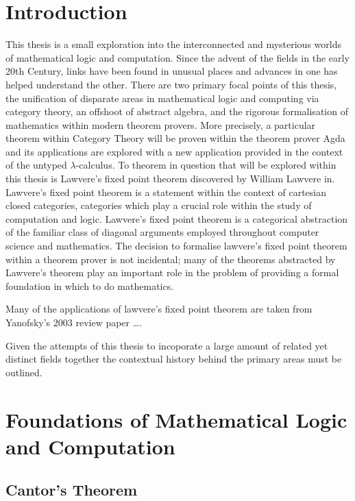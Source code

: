 
\section{Introduction}

This thesis is a small exploration into the interconnected and mysterious worlds
of mathematical logic and computation. Since the advent of the fields in the
early 20th Century, links have been found in unusual places and advances in one
has helped understand the other. There are two primary focal points of this
thesis, the unification of disparate areas in mathematical logic and computing
via category theory, an offshoot of abstract algebra, and the rigorous
formalisation of mathematics within modern theorem provers. More precisely, a
particular theorem within Category Theory will be proven within the theorem
prover Agda and its applications are explored with a new application provided in
the context of the untyped $\lambda$-calculus. To theorem in question that will
be explored within this thesis is Lawvere's fixed point theorem discovered by
William Lawvere in. Lawvere's fixed point theorem is a statement
within the context of cartesian closed categories, categories which play a
crucial role within the study of computation and logic. Lawvere's fixed point
theorem is a categorical abstraction of the familiar class of diagonal arguments
employed throughout computer science and mathematics. The decision to formalise
lawvere's fixed point theorem within a theorem prover is not incidental; many of
the theorems abstracted by Lawvere's theorem play an important role in the
problem of providing a formal foundation in which to do mathematics.

Many of the applications of lawvere's fixed point theorem are taken from
Yanofsky's 2003 review paper \ldots {}.

Given the attempts of this thesis to incoporate a large amount of related yet
distinct fields together the contextual history behind the primary areas must be
outlined.

\section{Foundations of Mathematical Logic and Computation}

\subsection{Cantor's Theorem}

